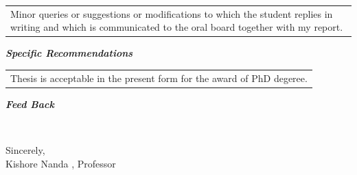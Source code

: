 \documentclass[11pt,a4paper]{letter} %
\begin{document}
\begin{letter}
\begin{center}
\begin{tabular}{  p{13.5cm}  }
   Minor queries or suggestions or modifications to which the student replies in writing and which is communicated to the oral board together with my report.  \\
    \end{tabular}
\end{center}
\hspace{1.1cm}\textbf{\textit{Specific Recommendations}}
\begin{center}
     \begin{tabular}{  p{13.5cm}  }
  
    Thesis is acceptable in the present form for the award of PhD degeree.  \\
    \end{tabular}
\end{center}
\hspace{1.1cm}\textbf{\textit{Feed Back}}
\begin{center}
     \begin{tabular}{  p{13.5cm}  }
  
      \\
    \end{tabular}
\end{center}

\closing{} \\

\hspace{10cm}Sincerely,\\ \indent
\hspace{10cm} Kishore Nanda , Professor


\end{letter}
\end{document}
